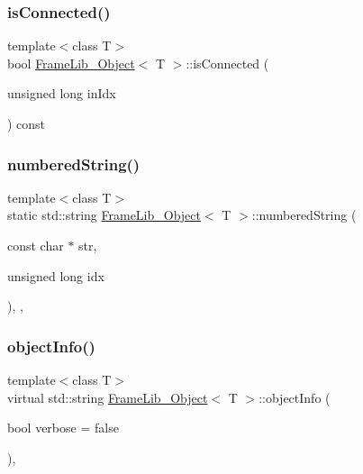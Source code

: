 \mbox{\label{class_frame_lib___object_a2b4ed60a6032ff9fab191fcb492ef404}} 
\subsubsection{\texorpdfstring{is\+Connected()}{isConnected()}}
{\footnotesize\ttfamily template$<$class T$>$ \\
bool \hyperlink{class_frame_lib___object}{Frame\+Lib\+\_\+\+Object}$<$ T $>$\+::is\+Connected (\begin{DoxyParamCaption}\item[{unsigned long}]{in\+Idx }\end{DoxyParamCaption}) const\hspace{0.3cm}{\ttfamily [inline]}}

\mbox{\label{class_frame_lib___object_a26307f11e68962614da4178115e665b7}} 
\subsubsection{\texorpdfstring{numbered\+String()}{numberedString()}}
{\footnotesize\ttfamily template$<$class T$>$ \\
static std\+::string \hyperlink{class_frame_lib___object}{Frame\+Lib\+\_\+\+Object}$<$ T $>$\+::numbered\+String (\begin{DoxyParamCaption}\item[{const char $\ast$}]{str,  }\item[{unsigned long}]{idx }\end{DoxyParamCaption})\hspace{0.3cm}{\ttfamily [inline]}, {\ttfamily [static]}, {\ttfamily [protected]}}

\mbox{\label{class_frame_lib___object_a10d673de9a3c59ace6a22ba1cff313c8}} 
\subsubsection{\texorpdfstring{object\+Info()}{objectInfo()}}
{\footnotesize\ttfamily template$<$class T$>$ \\
virtual std\+::string \hyperlink{class_frame_lib___object}{Frame\+Lib\+\_\+\+Object}$<$ T $>$\+::object\+Info (\begin{DoxyParamCaption}\item[{bool}]{verbose = {\ttfamily false} }\end{DoxyParamCaption})\hspace{0.3cm}{\ttfamily [inline]}, {\ttfamily [virtual]}}



